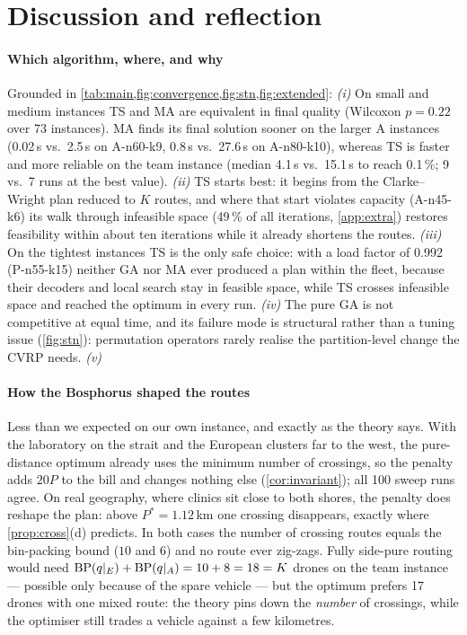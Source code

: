 \section{Discussion and reflection}\label{sec:discussion}
\paragraph{Which algorithm, where, and why} Grounded in \cref{tab:main,fig:convergence,fig:stn,fig:extended}:
\emph{(i)} On small and medium instances TS and MA are equivalent in final quality (Wilcoxon $p=0.22$ over 73
instances). MA finds its final solution sooner on the larger A instances (0.02\,s vs.\ 2.5\,s on A-n60-k9, 0.8\,s vs.\
27.6\,s on A-n80-k10), whereas TS is faster and more reliable on the team instance (median 4.1\,s vs.\ 15.1\,s to reach
0.1\,\%; 9 vs.\ 7 runs at the best value). \emph{(ii)} TS starts best: it begins from the Clarke--Wright plan reduced to $K$ routes,
and where that start violates capacity (A-n45-k6) its walk through infeasible space (49\,\% of all iterations,
\cref{app:extra}) restores feasibility within about ten iterations while it already shortens the routes. \emph{(iii)} On the tightest instances TS is the only safe choice: with a load factor of 0.992
(P-n55-k15) neither GA nor MA ever produced a plan within the fleet, because their decoders and local search stay in
feasible space, while TS crosses infeasible space and reached the optimum in every run. \emph{(iv)} The pure GA is not
competitive at equal time, and its failure mode is structural rather than a tuning issue (\cref{fig:stn}): permutation
operators rarely realise the partition-level change the CVRP needs. \emph{(v)} 

\paragraph{How the Bosphorus shaped the routes} Less than we expected on our own instance, and exactly as the theory
says. With the laboratory on the strait and the European clusters far to the west, the pure-distance optimum already
uses the minimum number of crossings, so the penalty adds $20P$ to the bill and changes nothing else
(\cref{cor:invariant}); all 100 sweep runs agree. On real geography, where clinics sit close to both shores, the penalty
does reshape the plan: above $P^\ast=1.12$\,km one crossing disappears, exactly where \cref{prop:cross}(d) predicts.
In both cases the number of crossing routes equals the bin-packing bound ($10$ and $6$) and no route ever zig-zags.
Fully side-pure routing would need $\operatorname{BP}(q|_E)+\operatorname{BP}(q|_A)=10+8=18=K$ drones on the team instance --- possible only
because of the spare vehicle --- but the optimum prefers 17 drones with one mixed route: the theory pins down the
\emph{number} of crossings, while the optimiser still trades a vehicle against a few kilometres.

